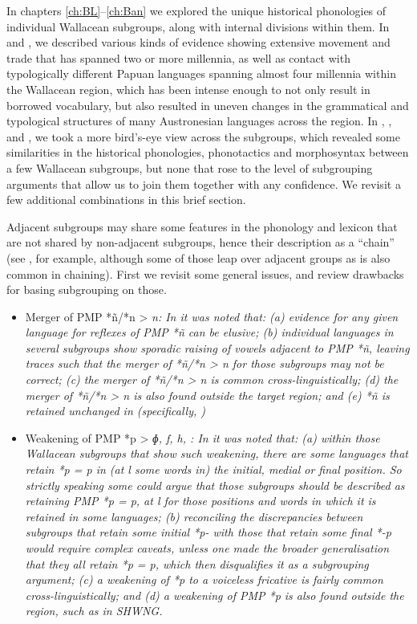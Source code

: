 In chapters \ref{ch:BL}--\ref{ch:Ban} we explored the unique historical phonologies
of individual Wallacean subgroups,
along with internal divisions within them.
In  and , we described various kinds of
evidence showing extensive movement
and trade that has spanned two or more millennia,
as well as contact with typologically different Papuan languages
spanning almost four millennia within the Wallacean region,
which has been intense enough to not only result in borrowed
vocabulary, but also resulted in uneven changes in the grammatical
and typological structures of many Austronesian languages across the region.
In , , and , we took a more
bird’s-eye view across the subgroups,
which revealed some similarities in the historical phonologies,
phonotactics and morphosyntax between a few Wallacean subgroups,
but none that rose to the level of subgrouping arguments that
allow us to join them together with any confidence.
We revisit a few additional combinations in this brief section.

Adjacent subgroups may share some features in the phonology
and lexicon that are not shared by non-adjacent subgroups,
hence their description as a “chain” (see ,
for example, although some of those leap over adjacent groups
as is also common in chaining).
First we revisit some general issues,
and review drawbacks for basing subgrouping on those.

\begin{itemize}
	\item	Merger of PMP *ñ/*n > \it{n}: In  it was noted
				that: (a) evidence for any given language for reflexes of PMP
				*ñ can be elusive; (b) individual languages in several subgroups
				show sporadic raising of vowels adjacent to PMP *ñ,
				leaving traces such that the merger of *ñ/*n > \it{n} for those
				subgroups may not be correct; (c) the merger of *ñ/*n
				> \it{n} is common cross-linguistically; (d) the merger of *ñ/*n
				> \it{n} is also found outside the target region;
				and (e) *ñ is retained unchanged in  (specifically,
				) 
	\item	Weakening of PMP *p > \it{ɸ,
				f, h,} {\0}: In  it was noted that: (a) within
				those Wallacean subgroups that show such weakening,
				there are some languages that retain *p = \it{p} in (at l
				some words in) the initial,
				medial or final position.
				So strictly speaking some could argue that those subgroups should
				be described as retaining PMP *p = \it{p},
				at l for those positions
				and words in which it is retained in some languages; (b) reconciling
				the discrepancies between subgroups that retain some initial
				*p- with those that retain some final *-p would require complex
				caveats, unless one made the broader generalisation that they all retain
				*p = \it{p}, which then disqualifies it as a subgrouping argument; (c) a weakening
				of *p to a voiceless fricative is fairly common cross-linguistically;
				and (d) a weakening of PMP *p is also found outside the region,
				such as in SHWNG.
\end{itemize}

